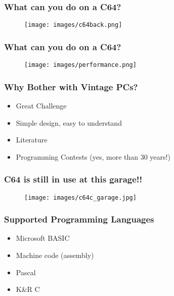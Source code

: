 \documentclass[aspectratio=43]{uva-inf-presentation}
\begin{document}
\begin{frame}
\frametitle{What can you do on a C64?}

\begin{figure}
\texttt{[image: images/c64back.png]}
\end{figure}

\end{frame}


\begin{frame}
\frametitle{What can you do on a C64?}

\begin{figure}
\texttt{[image: images/performance.png]}
\end{figure}

\end{frame}


\begin{frame}
\frametitle{Why Bother with Vintage PCs?}

\begin{itemize}
\item Great Challenge
\item Simple design, easy to understand
\item Literature
\item Programming Contests (yes, more than 30 years!)
\end{itemize}

\end{frame}


\begin{frame}
\frametitle{C64 is still in use at this garage!!}

\begin{figure}
\texttt{[image: images/c64c\_garage.jpg]}
\end{figure}

\end{frame}


\begin{frame}
\frametitle{Supported Programming Languages}

\begin{itemize}
\item Microsoft BASIC
\item Machine code (assembly)
\item Pascal
\item K\&R C
\end{itemize}

\end{frame}
\end{document}
